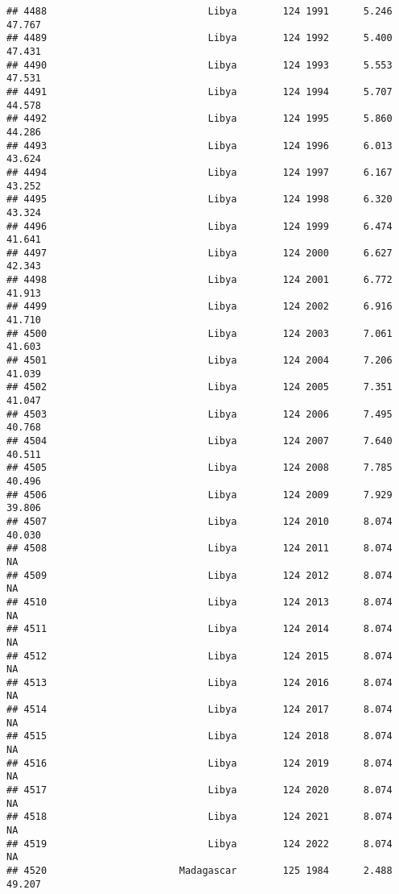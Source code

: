\documentclass[
]{article}
\begin{document}
\begin{verbatim}
## 4488                            Libya        124 1991      5.246     47.767
## 4489                            Libya        124 1992      5.400     47.431
## 4490                            Libya        124 1993      5.553     47.531
## 4491                            Libya        124 1994      5.707     44.578
## 4492                            Libya        124 1995      5.860     44.286
## 4493                            Libya        124 1996      6.013     43.624
## 4494                            Libya        124 1997      6.167     43.252
## 4495                            Libya        124 1998      6.320     43.324
## 4496                            Libya        124 1999      6.474     41.641
## 4497                            Libya        124 2000      6.627     42.343
## 4498                            Libya        124 2001      6.772     41.913
## 4499                            Libya        124 2002      6.916     41.710
## 4500                            Libya        124 2003      7.061     41.603
## 4501                            Libya        124 2004      7.206     41.039
## 4502                            Libya        124 2005      7.351     41.047
## 4503                            Libya        124 2006      7.495     40.768
## 4504                            Libya        124 2007      7.640     40.511
## 4505                            Libya        124 2008      7.785     40.496
## 4506                            Libya        124 2009      7.929     39.806
## 4507                            Libya        124 2010      8.074     40.030
## 4508                            Libya        124 2011      8.074         NA
## 4509                            Libya        124 2012      8.074         NA
## 4510                            Libya        124 2013      8.074         NA
## 4511                            Libya        124 2014      8.074         NA
## 4512                            Libya        124 2015      8.074         NA
## 4513                            Libya        124 2016      8.074         NA
## 4514                            Libya        124 2017      8.074         NA
## 4515                            Libya        124 2018      8.074         NA
## 4516                            Libya        124 2019      8.074         NA
## 4517                            Libya        124 2020      8.074         NA
## 4518                            Libya        124 2021      8.074         NA
## 4519                            Libya        124 2022      8.074         NA
## 4520                       Madagascar        125 1984      2.488     49.207

\end{verbatim}
\end{document}
